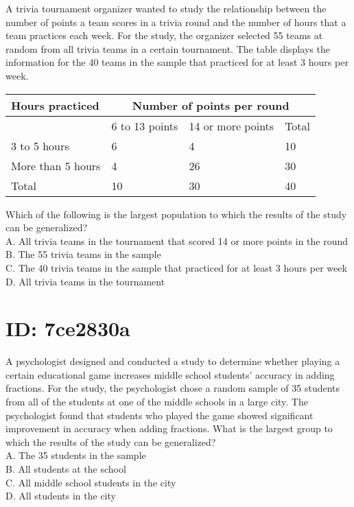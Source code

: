 
A trivia tournament organizer wanted to study the relationship between the number of points a team scores in a trivia round and the number of hours that a team practices each week. For the study, the organizer selected 55 teams at random from all trivia teams in a certain tournament. The table displays the information for the 40 teams in the sample that practiced for at least 3 hours per week.

\begin{center}
\begin{tabular}{|l|l|l|l|}
\hline
\multirow{2}{*}{Hours practiced} & \multicolumn{3}{|c|}{Number of points per round} \\
\hline
 & 6 to 13 points & 14 or more points & Total \\
\hline
3 to 5 hours & 6 & 4 & 10 \\
\hline
More than 5 hours & 4 & 26 & 30 \\
\hline
Total & 10 & 30 & 40 \\
\hline
\end{tabular}
\end{center}

Which of the following is the largest population to which the results of the study can be generalized?\\
A. All trivia teams in the tournament that scored 14 or more points in the round\\
B. The 55 trivia teams in the sample\\
C. The 40 trivia teams in the sample that practiced for at least 3 hours per week\\
D. All trivia teams in the tournament

\section*{ID: 7ce2830a}
A psychologist designed and conducted a study to determine whether playing a certain educational game increases middle school students' accuracy in adding fractions. For the study, the psychologist chose a random sample of 35 students from all of the students at one of the middle schools in a large city. The psychologist found that students who played the game showed significant improvement in accuracy when adding fractions. What is the largest group to which the results of the study can be generalized?\\
A. The 35 students in the sample\\
B. All students at the school\\
C. All middle school students in the city\\
D. All students in the city

